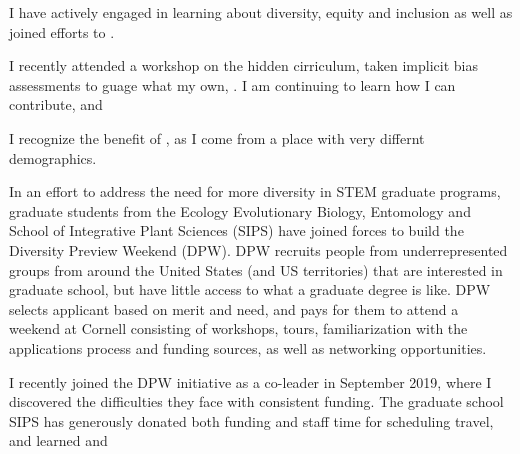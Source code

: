 \documentclass[11pt]{article}
\begin{document}



%

I have actively engaged in learning about diversity, equity and inclusion as well as joined efforts to . 


I recently attended a workshop on the hidden cirriculum, taken implicit bias assessments to guage what my own, . I am continuing to learn how I can contribute, and 



I recognize the benefit of , as I come from a place with very differnt demographics.







In an effort to address the need for more diversity in STEM graduate programs, graduate students from the Ecology Evolutionary Biology, Entomology and School of Integrative Plant Sciences (SIPS) have joined forces to build the Diversity Preview Weekend (DPW). DPW recruits people from underrepresented groups from around the United States (and US territories) that are interested in graduate school, but have little access to what a graduate degree is like. DPW selects applicant based on merit and need, and pays for them to attend a weekend at Cornell consisting of workshops, tours, familiarization with the applications process and funding sources, as well as networking opportunities. 

I recently joined the DPW initiative as a co-leader in September 2019, where I discovered the difficulties they face with consistent funding. The graduate school SIPS has generously donated both funding and staff time for scheduling travel, and learned and 
\end{document}
